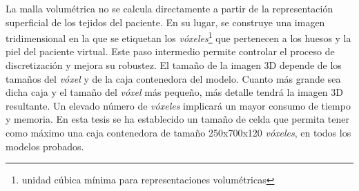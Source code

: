 La malla volumétrica no se calcula directamente a partir de la representación superficial de los tejidos del paciente. En su lugar, se construye una imagen tridimensional en la que se etiquetan los \emph{vóxeles}\footnote{unidad cúbica mínima para representaciones volumétricas} que pertenecen a los huesos y la piel del paciente virtual. Este paso intermedio permite controlar el proceso de discretización y mejora su robustez.
El tamaño de la imagen 3D depende de los tamaños del \emph{vóxel} y de la caja contenedora del modelo. Cuanto más grande sea dicha caja y el tamaño del \emph{vóxel} más pequeño, más detalle tendrá la imagen 3D resultante. Un elevado número de \emph{vóxeles} implicará un mayor consumo de tiempo y memoria.
En esta tesis se ha establecido un tamaño de celda que permita tener como máximo una caja contenedora de tamaño 250x700x120 \emph{vóxeles}, en todos los modelos probados.

